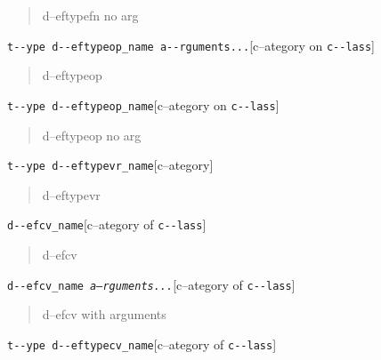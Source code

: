 \documentclass{book}
\begin{document}
%
\begin{quote}
\unskip{\parskip=0pt\noindent}%
d--eftypefn no arg
\end{quote}

\noindent\texttt{t{-}{-}ype d{-}{-}eftypeop\_name a{-}{-}rguments...}\hfill[c--ategory on \texttt{c{-}{-}lass}]



%
\begin{quote}
\unskip{\parskip=0pt\noindent}%
d--eftypeop
\end{quote}

\noindent\texttt{t{-}{-}ype d{-}{-}eftypeop\_name}\hfill[c--ategory on \texttt{c{-}{-}lass}]



%
\begin{quote}
\unskip{\parskip=0pt\noindent}%
d--eftypeop no arg
\end{quote}

\noindent\texttt{t{-}{-}ype d{-}{-}eftypevr\_name}\hfill[c--ategory]



%
\begin{quote}
\unskip{\parskip=0pt\noindent}%
d--eftypevr
\end{quote}

\noindent\texttt{d{-}{-}efcv\_name}\hfill[c--ategory of \texttt{c{-}{-}lass}]



%
\begin{quote}
\unskip{\parskip=0pt\noindent}%
d--efcv
\end{quote}

\noindent\texttt{d{-}{-}efcv\_name \EmbracOn{}\textnormal{\textsl{a--rguments...}}\EmbracOff{}}\hfill[c--ategory of \texttt{c{-}{-}lass}]



%
\begin{quote}
\unskip{\parskip=0pt\noindent}%
d--efcv with arguments
\end{quote}

\noindent\texttt{t{-}{-}ype d{-}{-}eftypecv\_name}\hfill[c--ategory of \texttt{c{-}{-}lass}]
\end{document}
